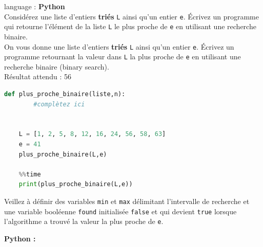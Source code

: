 \begin{Exercice}[15 minutes] language : \textbf{Python}\\

Considérez une liste d’entiers \textbf{triés} \lstinline{L} ainsi qu’un entier \lstinline{e}. Écrivez un programme qui retourne l'élément de la liste \lstinline{L} le plus proche de \lstinline{e} en utilisant une recherche binaire.\\

On vous donne une liste d’entiers \textbf{triés} \lstinline{L} ainsi qu’un entier \lstinline{e}. Écrivez un programme retournant la valeur dans \lstinline{L} la plus proche de \lstinline{e} en utilisant une recherche binaire (binary search).\\

Résultat attendu : 56\\

    \begin{lstlisting}[language=Python]
    def plus_proche_binaire(liste,n):
        #complètez ici
        
        
    L = [1, 2, 5, 8, 12, 16, 24, 56, 58, 63]  
    e = 41
    plus_proche_binaire(L,e)
    
    %%time
    print(plus_proche_binaire(L,e))
    \end{lstlisting}

\begin{conseil}
    Veillez à définir des variables \lstinline{min} et \lstinline{max} délimitant l'intervalle de recherche et une variable booléenne \lstinline{found} initialisée \lstinline{false} et qui devient \lstinline{true} lorsque l'algorithme a trouvé la valeur la plus proche de \lstinline{e}. 
    
\end{conseil}

    \begin{solution}
        \textbf{Python :}
        
    \end{solution}

\end{Exercice}

